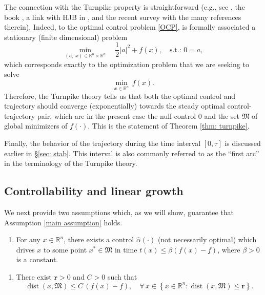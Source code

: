 \documentclass[12pt]{amsart}
\numberwithin{equation}{section}
\theoremstyle{plain}
\begin{document}
The connection with the Turnpike property is straightforward (e.g., see \cite{porretta2013long}, the book \cite{zaslavski2015turnpike}, a link with HJB in  \cite{esteve2022turnpike}, and the recent survey \cite{trelat2025turnpike} with the many references therein). Indeed, to the optimal control problem \eqref{OCP}, is formally associated a stationary (finite dimensional) problem
\begin{equation*}
    \min\limits_{(a,\;x)\in \mathbb{R}^{n}\times\mathbb{R}^{n}} \quad 
    \frac{1}{2}|a|^{2} + f(x), \quad \text{s.t.: } 0 = a,
\end{equation*}
which corresponds exactly to the optimization problem that we are seeking to solve
\begin{equation*}
    \min\limits_{x\in\mathbb{R}^{n}} \, f(x).
\end{equation*}
Therefore, the Turnpike theory tells us that both the optimal control and trajectory should converge (exponentially) towards the steady optimal control-trajectory pair, which are in the present case the null control $0$ and the set $\mathfrak{M}$ of global minimizers of $f(\cdot)$. This is the statement of Theorem \ref{thm: turnpike}.


Finally, the behavior of the trajectory during the time interval $[0,\tau]$ is discussed earlier in \S \ref{sec: stab}. This interval is also commonly referred to as the ``first arc'' in the terminology of the Turnpike theory.





\subsection{Controllability and linear growth}

We next provide two assumptions which, as we will show, guarantee that Assumption \ref{main assumption} holds.


\begin{enumerate}[label=\textbf{(E)}]
    \item\label{Cont} For any $x \in \mathbb{R}^{n}$, there exists a control $\hat{\alpha}(\cdot)$ (not necessarily optimal) which drives $x$ to some point $x^{*} \in \mathfrak{M}$ in time $t(x)\leq \beta(f(x)-\underline{f})$, where $\beta>0$ is a constant.
\end{enumerate}
\begin{enumerate}[label=\textbf{(F)}]
    \item\label{LG} There exist $\mathbf{r}>0$  and $C>0$  such that
\begin{equation*}%
    \operatorname{dist}(x,\mathfrak{M}) \leq C\, (f(x)-\underline{f}), \quad\forall\,x \in \left\{x\in\mathbb{R}^{n}: \operatorname{dist}(x,\mathfrak{M})\leq \mathbf{r}\right\}.
\end{equation*}
\end{enumerate}
\end{document}
